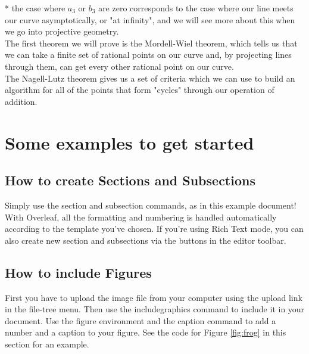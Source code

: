 \documentclass{article}
\begin{document}
* the case where $a_3$ or $b_3$ are zero corresponds to the case where our line meets our curve asymptotically, or "at infinity", and we will see more about this when we go into projective geometry.
\\ 

The first theorem we will prove is the Mordell-Wiel theorem, which tells us that we can take a finite set of rational points on our curve and, by projecting lines through them, can get every other rational point on our curve.\\

The Nagell-Lutz theorem gives us a set of criteria which we can use to build an algorithm for all of the points that form "cycles" through our operation of addition.\\


 
 
 
 
 
 

\section{Some examples to get started}

\subsection{How to create Sections and Subsections}

Simply use the section and subsection commands, as in this example document! With Overleaf, all the formatting and numbering is handled automatically according to the template you've chosen. If you're using Rich Text mode, you can also create new section and subsections via the buttons in the editor toolbar.

\subsection{How to include Figures}

First you have to upload the image file from your computer using the upload link in the file-tree menu. Then use the includegraphics command to include it in your document. Use the figure environment and the caption command to add a number and a caption to your figure. See the code for Figure \ref{fig:frog} in this section for an example.
\end{document}
